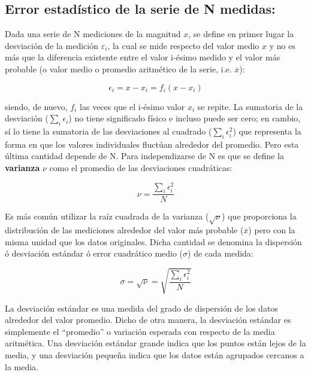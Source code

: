 \subsection{Error estadístico de la serie de N medidas:}

Dada  una  serie  de N  mediciones  de  la  magnitud $x$,  se  define  en  primer  lugar la desviación  de  la medición $ε_i$,  
la  cual  se  mide  respecto  del  valor  medio $x$  y  no  es  más  que  la  diferencia  existente entre  el  valor i-ésimo  
medido y el  valor  más  probable  (o  valor  medio  o  promedio  aritmético  de  la serie, i.e. $\overline{x}$): 

\begin{equation}
\epsilon_{i} = x - x_{i} = f_{i}( x - x_{i} ) 
\end{equation}

siendo, de nuevo, $f_i$ las veces que el i-ésimo valor $x_i$ se repite. La  sumatoria  de  la  desviación  ($\sum_i \epsilon_i$)  
no  tiene  significado  físico  e  incluso  puede  ser  cero;  en cambio, sí lo tiene la sumatoria de las desviaciones al 
cuadrado ($\sum_i \epsilon_i^2$) que representa la forma en que los valores individuales fluctúan alrededor del promedio.  Pero 
esta última cantidad depende de N.  Para independizarse de N es que se define la \textbf{varianza} $\nu$ como el promedio de las 
desviaciones cuadráticas:

\begin{equation}
 \nu = \frac{\sum_i \epsilon_i^2}{N}
\end{equation}

Es más común utilizar la raíz cuadrada de la varianza ($\sqrt{\nu}$) que proporciona la distribución de las mediciones alrededor 
del valor más probable ($\overline{x}$) pero con la misma unidad que los datos originales.  Dicha  cantidad  se  denomina  la 
dispersión  ó desviación  estándar  ó error  cuadrático  medio ($\sigma$)  de cada medida:

\begin{equation}
 \sigma = \sqrt{\nu} =\sqrt{\frac{\sum_i \epsilon_i^2}{N}}
\end{equation}

La desviación estándar es una medida del grado de dispersión de los datos alrededor del valor promedio.  Dicho de otra manera, la 
desviación estándar es simplemente el ``promedio'' o variación esperada con respecto de la media aritmética.  Una desviación 
estándar grande indica que los puntos están lejos de la media, y una desviación pequeña indica que los datos están agrupados 
cercanos a la media.\\

